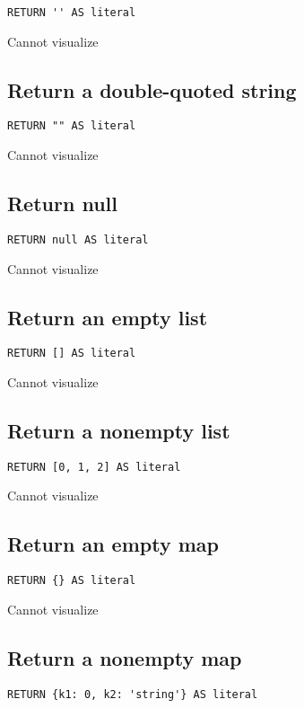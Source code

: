 \begin{lstlisting}
RETURN '' AS literal
\end{lstlisting}

Cannot visualize
\subsection{Return a double-quoted string}

\begin{lstlisting}
RETURN "" AS literal
\end{lstlisting}

Cannot visualize
\subsection{Return null}

\begin{lstlisting}
RETURN null AS literal
\end{lstlisting}

Cannot visualize
\subsection{Return an empty list}

\begin{lstlisting}
RETURN [] AS literal
\end{lstlisting}

Cannot visualize
\subsection{Return a nonempty list}

\begin{lstlisting}
RETURN [0, 1, 2] AS literal
\end{lstlisting}

Cannot visualize
\subsection{Return an empty map}

\begin{lstlisting}
RETURN {} AS literal
\end{lstlisting}

Cannot visualize
\subsection{Return a nonempty map}

\begin{lstlisting}
RETURN {k1: 0, k2: 'string'} AS literal
\end{lstlisting}

